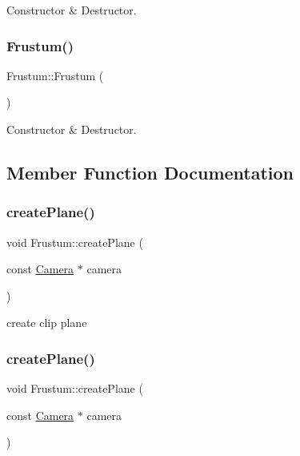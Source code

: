 Constructor \& Destructor. \mbox{\label{classFrustum_a172ae3492592e3ac891642299d628494}} 
\subsubsection{\texorpdfstring{Frustum()}{Frustum()}\hspace{0.1cm}{\footnotesize\ttfamily [2/2]}}
{\footnotesize\ttfamily Frustum\+::\+Frustum (\begin{DoxyParamCaption}{ }\end{DoxyParamCaption})\hspace{0.3cm}{\ttfamily [inline]}}

Constructor \& Destructor. 

\subsection{Member Function Documentation}
\mbox{\label{classFrustum_a3b271a1a0fcce5eeaca0ec684fe02f7b}} 
\subsubsection{\texorpdfstring{create\+Plane()}{createPlane()}\hspace{0.1cm}{\footnotesize\ttfamily [1/2]}}
{\footnotesize\ttfamily void Frustum\+::create\+Plane (\begin{DoxyParamCaption}\item[{const \hyperlink{classCamera}{Camera} $\ast$}]{camera }\end{DoxyParamCaption})\hspace{0.3cm}{\ttfamily [protected]}}

create clip plane \mbox{\label{classFrustum_a3b271a1a0fcce5eeaca0ec684fe02f7b}} 
\subsubsection{\texorpdfstring{create\+Plane()}{createPlane()}\hspace{0.1cm}{\footnotesize\ttfamily [2/2]}}
{\footnotesize\ttfamily void Frustum\+::create\+Plane (\begin{DoxyParamCaption}\item[{const \hyperlink{classCamera}{Camera} $\ast$}]{camera }\end{DoxyParamCaption})\hspace{0.3cm}{\ttfamily [protected]}}

